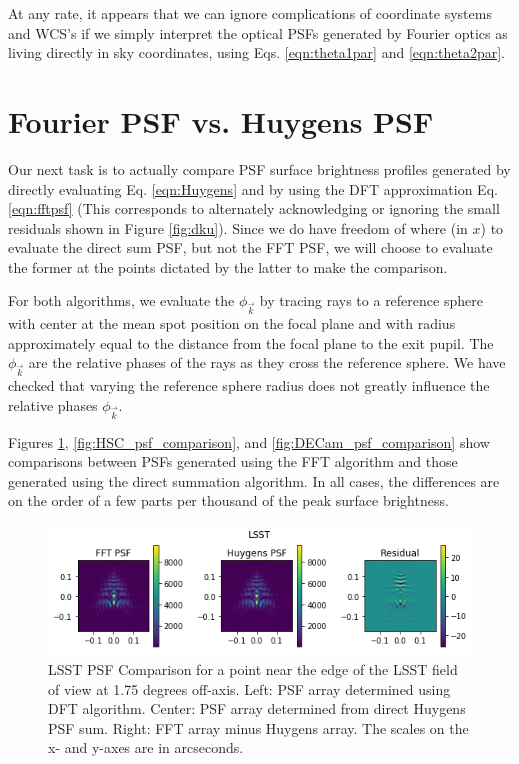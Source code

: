 \documentclass{article}
\begin{document}
At any rate, it appears that we can ignore complications of coordinate systems and WCS's if we
simply interpret the optical PSFs generated by Fourier optics as living directly in sky coordinates, using
Eqs. \ref{eqn:theta1par} and \ref{eqn:theta2par}.

\section{Fourier PSF vs. Huygens PSF}

Our next task is to actually compare PSF surface brightness profiles generated by directly
evaluating Eq. \ref{eqn:Huygens} and by using the DFT approximation Eq. \ref{eqn:fftpsf}  (This
corresponds to alternately acknowledging or ignoring the small residuals shown in Figure
\ref{fig:dku}).  Since we do have freedom of where (in $x$) to evaluate the direct sum PSF, but not
the FFT PSF, we will choose to evaluate the former at the points dictated by the latter to make the
comparison.

For both algorithms, we evaluate the $\phi_{\vec{k}}$ by tracing rays to a reference sphere with
center at the mean spot position on the focal plane and with radius approximately equal to the
distance from the focal plane to the exit pupil.  The $\phi_{\vec{k}}$ are the relative
phases of the rays as they cross the reference sphere.  We have checked that varying the reference sphere
radius does not greatly influence the relative phases $\phi_{\vec{k}}$.

Figures \ref{fig:LSST_psf_comparison}, \ref{fig:HSC_psf_comparison}, and
\ref{fig:DECam_psf_comparison} show comparisons between PSFs generated using the FFT algorithm and
those generated using the direct summation algorithm.  In all cases, the differences are on the
order of a few parts per thousand of the peak surface brightness.


\begin{figure}
    \includegraphics[scale=0.8]{LSST_PSF_comparison.png}

    \caption{LSST PSF Comparison for a point near the edge of the LSST field of view at 1.75 degrees
    off-axis.  Left: PSF array determined using DFT algorithm.  Center: PSF array determined from
    direct Huygens PSF sum.  Right: FFT array minus Huygens array.  The scales on the x- and y-axes
    are in arcseconds. }

    \label{fig:LSST_psf_comparison}
\end{figure}
\end{document}
